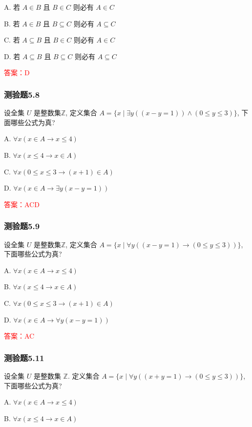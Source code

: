 \documentclass[UTF8, heading=true]{ctexart}
\begin{document}
A. 
若 $A \in B$ 且 $B \in C$ 则必有 $A \in C$

B. 
若 $A \in B$ 且 $B \subseteq C$ 则必有 $A \subseteq C$

C. 
若 $A \subseteq B$ 且 $B \in C$ 则必有 $A \in C$

D. 
若 $A \subseteq B$ 且 $B \subseteq C$ 则必有 $A \subseteq C$

\textcolor{red}{答案：D}


\subsubsection{测验题5.8}
设全集 $U$ 是整数集$\mathbb{Z}$, 定义集合 $A=\{x \mid \exists y((x-y=1)) \wedge(0 \leq y \leq 3)\}$, 下面哪些公式为真?

A. $\forall x(x \in A \rightarrow x \leq 4)$

B. $\forall x(x \leq 4 \rightarrow x \in A)$

C. $\forall x(0 \leq x \leq 3 \rightarrow(x+1) \in A)$

D. $\forall x(x \in A \rightarrow \exists y(x-y=1))$

\textcolor{red}{答案：ACD}

\subsubsection{测验题5.9}

设全集 $U$ 是整数集$\mathbb{Z}$, 定义集合 $A=\{x \mid \forall y((x-y=1) \rightarrow(0 \leq y \leq 3))\}$, 下面哪些公式为真?

A. $\forall x(x \in A \rightarrow x \leq 4)$

B. $\forall x(x \leq 4 \rightarrow x \in A)$

C. $\forall x(0 \leq x \leq 3 \rightarrow(x+1) \in A)$

D. $\forall x(x \in A \rightarrow \forall y(x-y=1))$

\textcolor{red}{答案：AC}

\subsubsection{测验题5.11}

设全集 $U$ 是整数集 $\mathbb{Z}$. 定义集合 $A=\{x \mid \forall y((x+y=1) \rightarrow(0 \leq y \leq 3))\}$, 下面哪些公式为真?

A. $\forall x(x \in A \rightarrow x \leq 4)$

B. $\forall x(x \leq 4 \rightarrow x \in A)$
\end{document}
